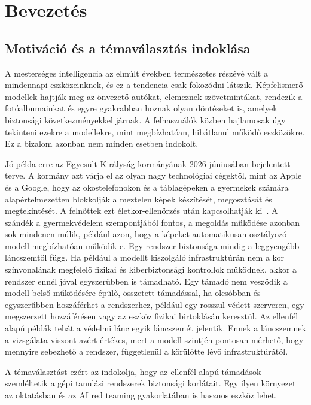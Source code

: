 ﻿\chapter{Bevezetés}

\section{Motiváció és a témaválasztás indoklása}
A mesterséges intelligencia az elmúlt években természetes részévé vált a mindennapi eszközeinknek, és ez a tendencia 
csak fokozódni látszik. 
Képfelismerő modellek hajtják meg az önvezető autókat, elemeznek szövetmintákat, rendezik a fotóalbumainkat 
és egyre gyakrabban hoznak olyan döntéseket is, amelyek biztonsági következményekkel járnak. 
A felhasználók közben hajlamosak úgy tekinteni ezekre a modellekre, mint megbízhatóan, hibátlanul működő eszközökre. 
Ez a bizalom azonban nem minden esetben indokolt. 

Jó példa erre az Egyesült Királyság kormányának 2026 júniusában bejelentett terve. 
A kormány azt várja el az olyan nagy technológiai cégektől, mint az Apple és a Google, hogy az okostelefonokon és a 
táblagépeken a gyermekek számára alapértelmezetten blokkolják a meztelen képek készítését, megosztását és megtekintését. 
A felnőttek ezt életkor-ellenőrzés után kapcsolhatják ki~\cite{govuk2026nudity}. 
A szándék a gyermekvédelem szempontjából fontos, a megoldás működése azonban sok mindenen múlik, például azon, 
hogy a képeket automatikusan osztályozó modell megbízhatóan működik-e. 
Egy rendszer biztonsága mindig a leggyengébb láncszemtől függ. 
Ha például a modellt kiszolgáló infrastruktúrán nem a kor színvonalának megfelelő fizikai és kiberbiztonsági kontrollok működnek, akkor 
a rendszer ennél jóval egyszerűbben is támadható. 
Egy támadó nem vesződik a modell belső működésére épülő, összetett támadással, ha olcsóbban és egyszerűbben hozzáférhet a 
rendszerhez, például egy rosszul védett szerveren, egy megszerzett hozzáférésen vagy az eszköz fizikai birtoklásán keresztül. 
Az ellenfél alapú példák tehát a védelmi lánc egyik láncszemét jelentik. 
Ennek a láncszemnek a vizsgálata viszont azért értékes, mert a modell szintjén pontosan mérhető, hogy mennyire sebezhető 
a rendszer, függetlenül a körülötte lévő infrastruktúrától. 

A témaválasztást ezért az indokolja, hogy az ellenfél alapú támadások szemléltetik a gépi tanulási rendszerek biztonsági 
korlátait. 
Egy ilyen környezet az oktatásban és az AI red teaming gyakorlatában is hasznos eszköz lehet. 

